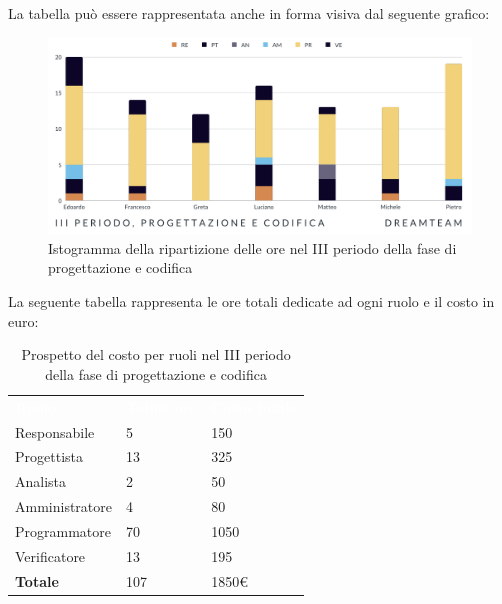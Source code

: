 La tabella può essere rappresentata anche in forma visiva dal seguente grafico:
\begin{figure}[H]
\centering
\includegraphics[scale=0.65]{Sezioni/SezioniPreventivo/grafici/Progettazione_codifica_III_periodo.png}
\caption{Istogramma della ripartizione delle ore nel III periodo della fase di progettazione e codifica}
\end{figure}

La seguente tabella rappresenta le ore totali dedicate ad ogni ruolo e il costo in euro:

\begin{table}[H]
\begin{center}
\renewcommand{\arraystretch}{1.5}
\begin{tabular}{ m{}<{\centering}  m{}<{\centering} m{}<{\centering}}
	\rowcolor{darkblue}
	\textcolor{white}{\textbf{Ruolo}}&\textcolor{white}{\textbf{Totale ore}}&\textcolor{white}{\textbf{Costo totale}}\\ 

	Responsabile  & 5 & 150 \\	
	
	Progettista & 13 & 325 \\
	
	Analista & 2 & 50 \\

	Amministratore & 4 & 80 \\
	
	Programmatore & 70 & 1050 \\
	
	Verificatore & 13 & 195 \\
	
	\textbf{Totale} & 107 & 1850\euro \\
	
\end{tabular}
\caption{Prospetto del costo per ruoli nel III periodo della fase di progettazione e codifica}
\end{center}
\end{table}

